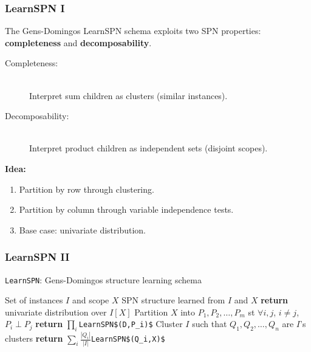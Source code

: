 \documentclass{beamer}
\newcommand{\indep}{\perp}
\newcommand{\code}[1]{\lstinline[mathescape=true]{#1}}
\newcommand{\mcode}[1]{\lstinline[mathescape]!#1!}
\begin{document}
\begin{frame}
  \frametitle{LearnSPN I}

  The Gens-Domingos LearnSPN schema exploits two SPN properties:
  {\color{blue}\textbf{completeness}} and {\color{red}\textbf{decomposability}}.

  \begin{description}
    \item[\color{blue}Completeness:]~\\
      Interpret sum children as clusters (similar instances).
    \item[\color{red}Decomposability:]~\\
      Interpret product children as independent sets (disjoint scopes).
  \end{description}

  \textbf{Idea:}
  \begin{enumerate}
    \item {\color{blue}Partition by row through clustering.}
    \item {\color{red}Partition by column through variable independence tests.}
    \item Base case: univariate distribution.
  \end{enumerate}
\end{frame}

\begin{frame}
  \frametitle{LearnSPN II}

  \begin{algorithm}[H]
    \caption{\code{LearnSPN}: Gens-Domingos structure learning schema}
    \begin{algorithmic}[1]
      \Require Set of instances $I$ and scope $X$
      \Ensure SPN structure learned from $I$ and $X$
        \State \textbf{return} univariate distribution over $I[X]$
      \EndIf%
      \State Partition $X$ into $P_1,P_2,\ldots,P_m$ st $\forall i, j$, $i\neq j$, $P_i\indep P_j$
        \State \textbf{return} $\prod_i$\mcode{LearnSPN$(D,P_i)$}
      \EndIf%
      \State Cluster $I$ such that $Q_1,Q_2,\ldots,Q_n$ are $I$'s clusters
      \State \textbf{return} $\sum_i\frac{|Q_i|}{|I|}$\mcode{LearnSPN$(Q_i,X)$}
    \end{algorithmic}
  \end{algorithm}

\end{frame}
\end{document}
